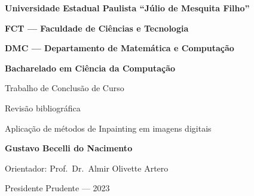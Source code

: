 \pagestyle{empty}
\begin{center}
\bf{Universidade Estadual Paulista ``Júlio de Mesquita Filho''}
  
  \bf{FCT — Faculdade de Ciências e Tecnologia}
  
  \bf{DMC — Departamento de Matemática e Computação}
  
  \bf{Bacharelado em Ciência da Computação}
  
  \vspace*{\fill}
  \vspace{42pt}
  \Large{	\textmd{Trabalho de Conclusão de Curso}}
    
  \large{Revisão bibliográfica}
  
  \vspace{42pt}
  \Large{Aplicação de métodos de Inpainting em imagens digitais}
  
  \vspace{42pt}
  \normalsize{\bf{Gustavo Becelli do Nacimento}
  
  \vspace{12pt}
  Orientador: \textmd{Prof.\ Dr.\ Almir Olivette Artero}}
  
  \vspace*{\fill}
  \vspace{12pt}
  Presidente Prudente --- 2023
\end{center}